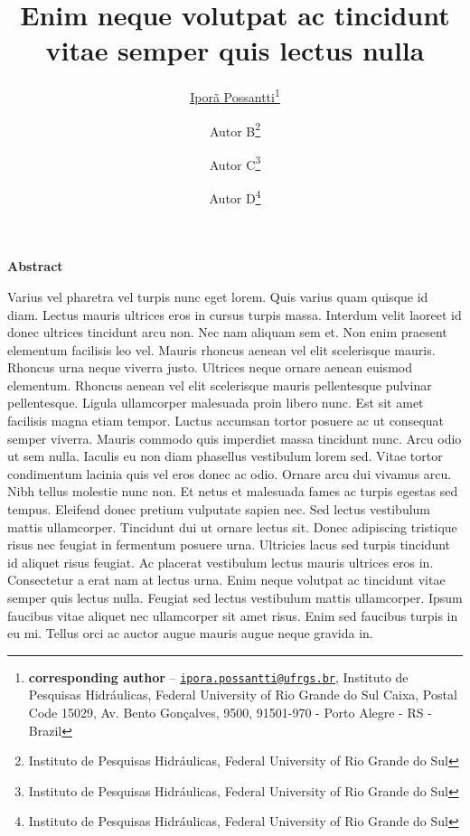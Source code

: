 \documentclass[11pt]{article}
\title{\Large{\textsf{\textbf{Enim neque volutpat ac tincidunt vitae semper quis lectus nulla}}}}
\author{
\href{https://orcid.org/0000-0002-2194-4516}{Iporã Possantti}\thanks{\textbf{corresponding author} -- \href{mailto:ipora.possantti@ufrgs.br}{\texttt{ipora.possantti@ufrgs.br}}, Instituto de Pesquisas Hidráulicas, Federal University of Rio Grande do Sul Caixa, Postal Code 15029, Av. Bento Gonçalves, 9500, 91501-970 - Porto Alegre - RS - Brazil} \and
Autor B\thanks{Instituto de Pesquisas Hidráulicas, Federal University of Rio Grande do Sul} \and 
\and Autor C\thanks{Instituto de Pesquisas Hidráulicas, Federal University of Rio Grande do Sul}
\and Autor D\thanks{Instituto de Pesquisas Hidráulicas, Federal University of Rio Grande do Sul}
}
\begin{document}
\maketitle  %
	
\begin{adjustwidth}{20pt}{20pt}
\begin{spacing}{0.8}
	\small
	\begin{center}
		\vspace{10mm}
		\textsf{\textbf{Abstract}}
		\vspace{5mm}
	\end{center}
	
	\noindent Varius vel pharetra vel turpis nunc eget lorem. Quis varius quam quisque id diam. Lectus mauris ultrices eros in cursus turpis massa. Interdum velit laoreet id donec ultrices tincidunt arcu non. Nec nam aliquam sem et. Non enim praesent elementum facilisis leo vel. Mauris rhoncus aenean vel elit scelerisque mauris. Rhoncus urna neque viverra justo. Ultrices neque ornare aenean euismod elementum. Rhoncus aenean vel elit scelerisque mauris pellentesque pulvinar pellentesque. Ligula ullamcorper malesuada proin libero nunc. Est sit amet facilisis magna etiam tempor. Luctus accumsan tortor posuere ac ut consequat semper viverra. Mauris commodo quis imperdiet massa tincidunt nunc. Arcu odio ut sem nulla. Iaculis eu non diam phasellus vestibulum lorem sed. Vitae tortor condimentum lacinia quis vel eros donec ac odio. Ornare arcu dui vivamus arcu. Nibh tellus molestie nunc non. Et netus et malesuada fames ac turpis egestas sed tempus. Eleifend donec pretium vulputate sapien nec. Sed lectus vestibulum mattis ullamcorper. Tincidunt dui ut ornare lectus sit. Donec adipiscing tristique risus nec feugiat in fermentum posuere urna. Ultricies lacus sed turpis tincidunt id aliquet risus feugiat. Ac placerat vestibulum lectus mauris ultrices eros in. Consectetur a erat nam at lectus urna. Enim neque volutpat ac tincidunt vitae semper quis lectus nulla. Feugiat sed lectus vestibulum mattis ullamcorper. Ipsum faucibus vitae aliquet nec ullamcorper sit amet risus. Enim sed faucibus turpis in eu mi. Tellus orci ac auctor augue mauris augue neque gravida in. \\[2ex]
	

\end{spacing}
\end{adjustwidth}
\end{document}
